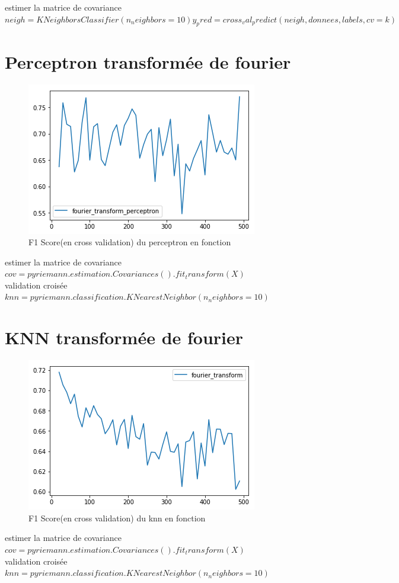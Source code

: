 \documentclass{article}
\begin{document}
estimer la matrice de covariance\\
$
neigh = KNeighborsClassifier(n_neighbors=10)
    y_pred = cross_val_predict(neigh,donnees,labels,cv=k)
$
\\


\section{Perceptron transformée de fourier }
\begin{figure}[H]
\begin{center}
\includegraphics[scale=1]{images/perceptron_tf_f1Score.png}
\end{center}
\caption{F1 Score(en cross validation) du perceptron en fonction}
\end{figure}

estimer la matrice de covariance\\
$
cov = pyriemann.estimation.Covariances().fit_transform(X)
$
\\
validation croisée\\
$
knn = pyriemann.classification.KNearestNeighbor(n_neighbors=10)
$
\section{KNN transformée de fourier }
\begin{figure}[H]
\begin{center}
\includegraphics[scale=1]{images/knn_tf_f1Score.png}
\end{center}
\caption{F1 Score(en cross validation) du knn en fonction}
\end{figure}

estimer la matrice de covariance\\
$
cov = pyriemann.estimation.Covariances().fit_transform(X)
$
\\
validation croisée\\
$
knn = pyriemann.classification.KNearestNeighbor(n_neighbors=10)
$
\end{document}
